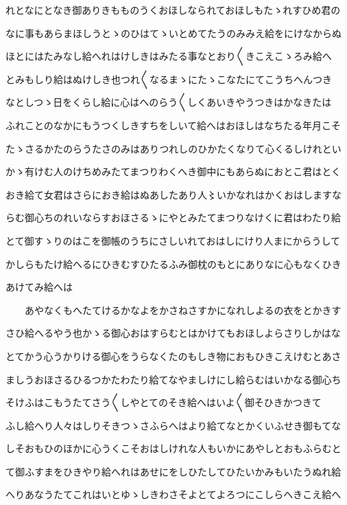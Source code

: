\documentclass[a4paper,11pt,landscape]{ltjtarticle}
\begin{document}
\par\medskip
れとなにとなき御ありきもものうくおほしなられておほしもたゝれすひめ君の
\par\medskip
なに事もあらまほしうとゝのひはてゝいとめてたうのみみえ給をにけなからぬ
\par\medskip
ほとにはたみなし給へれはけしきはみたる事なとおり〱きこえこゝろみ給へ
\par\medskip
とみもしり給はぬけしき也つれ〱なるまゝにたゝこなたにてこうちへんつき
\par\medskip
なとしつゝ日をくらし給に心はへのらう〱しくあいきやうつきはかなきたは
\par\medskip
ふれことのなかにもうつくしきすちをしいて給へはおほしはなちたる年月こそ
\par\medskip
たゝさるかたのらうたさのみはありつれしのひかたくなりて心くるしけれとい
\par\medskip
かゝ有けむ人のけちめみたてまつりわくへき御中にもあらぬにおとこ君はとく
\par\medskip
おき給て女君はさらにおき給はぬあしたあり人〻いかなれはかくおはしますな
\par\medskip
らむ御心ちのれいならすおほさるゝにやとみたてまつりなけくに君はわたり給
\par\medskip
とて御すゝりのはこを御帳のうちにさしいれておはしにけり人まにからうして
\par\medskip
かしらもたけ給へるにひきむすひたるふみ御枕のもとにありなに心もなくひき
\par\medskip
あけてみ給へは
\par\medskip
　　あやなくもへたてけるかなよをかさねさすかになれしよるの衣をとかきす
\par\medskip
さひ給へるやう也かゝる御心おはすらむとはかけてもおほしよらさりしかはな
\par\medskip
とてかう心うかりける御心をうらなくたのもしき物におもひきこえけむとあさ
\par\medskip
ましうおほさるひるつかたわたり給てなやましけにし給らむはいかなる御心ち
\par\medskip
そけふはこもうたてさう〱しやとてのそき給へはいよ〱御そひきかつきて
\par\medskip
ふし給へり人々はしりそきつゝさふらへはより給てなとかくいふせき御もてな
\par\medskip
しそおもひのほかに心うくこそおはしけれな人もいかにあやしとおもふらむと
\par\medskip
て御ふすまをひきやり給へれはあせにをしひたしてひたいかみもいたうぬれ給
\par\medskip
へりあなうたてこれはいとゆゝしきわさそよとてよろつにこしらへきこえ給へ
\end{document}
